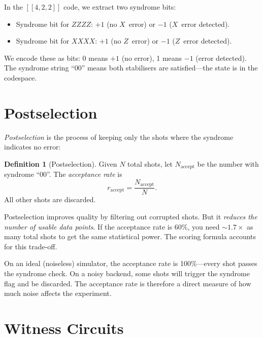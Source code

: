 \documentclass[11pt,a4paper,twoside]{report}
\theoremstyle{definition}
\newtheorem{definition}{Definition}[chapter]
\begin{document}
In the $[\![4,2,2]\!]$ code, we extract two syndrome bits:
\begin{itemize}
  \item Syndrome bit for $ZZZZ$: $+1$ (no $X$~error) or $-1$ ($X$~error
        detected).
  \item Syndrome bit for $XXXX$: $+1$ (no $Z$~error) or $-1$ ($Z$~error
        detected).
\end{itemize}

We encode these as bits: 0 means $+1$ (no error), 1 means $-1$ (error
detected). The syndrome string ``00'' means both stabilisers are
satisfied---the state is in the codespace.

\section{Postselection}
\label{sec:postselection}

\emph{Postselection} is the process of keeping only the shots where the
syndrome indicates no error:

\begin{definition}[Postselection]
Given $N$ total shots, let $N_{\text{accept}}$ be the number with
syndrome ``00''. The \emph{acceptance rate} is
\begin{equation}
  r_{\text{accept}} = \frac{N_{\text{accept}}}{N}.
\end{equation}
All other shots are discarded.
\end{definition}

\begin{concept}[title={The Cost of Postselection}]
Postselection improves quality by filtering out corrupted shots. But it
\emph{reduces the number of usable data points}. If the acceptance rate
is 60\%, you need $\sim\!1.7\times$ as many total shots to get the same
statistical power. The scoring formula accounts for this trade-off.
\end{concept}

On an ideal (noiseless) simulator, the acceptance rate is 100\%---every
shot passes the syndrome check. On a noisy backend, some shots will
trigger the syndrome flag and be discarded. The acceptance rate is
therefore a direct measure of how much noise affects the experiment.

\section{Witness Circuits}
\label{sec:witness-circuits}
\end{document}
